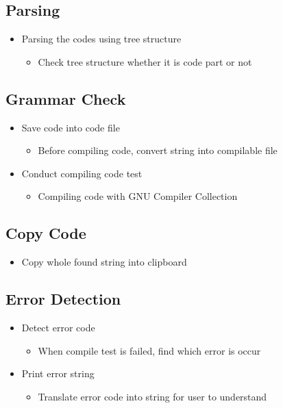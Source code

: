 \documentclass[conference]{IEEEtran}
\begin{document}
\subsection{Parsing}
\begin{itemize}
  \item Parsing the codes using tree structure
  \begin{itemize}
    \item Check tree structure whether it is code part or not
  \end{itemize}
\end{itemize}
\textit{ }


\subsection{Grammar Check}
\begin{itemize}
  \item Save code into code file
  \begin{itemize}
    \item Before compiling code, convert string into compilable file
  \end{itemize}
  \item Conduct compiling code test
  \begin{itemize}
    \item Compiling code with GNU Compiler Collection
  \end{itemize}
\end{itemize}
\textit{ }


\subsection{Copy Code}
  \begin{itemize}
    \item Copy whole found string into clipboard
  \end{itemize}
\textit{ }


\subsection{Error Detection}
\begin{itemize}
  \item Detect error code
  \begin{itemize}
    \item When compile test is failed, find which error is occur
  \end{itemize}
  \item Print error string
  \begin{itemize}
    \item Translate error code into string for user to understand
  \end{itemize}
\end{itemize}
\textit{ }
\end{document}
